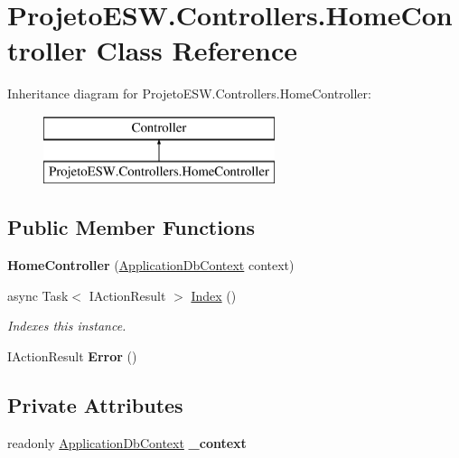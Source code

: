 \hypertarget{class_projeto_e_s_w_1_1_controllers_1_1_home_controller}{}\section{Projeto\+E\+S\+W.\+Controllers.\+Home\+Controller Class Reference}
\label{class_projeto_e_s_w_1_1_controllers_1_1_home_controller}
Inheritance diagram for Projeto\+E\+S\+W.\+Controllers.\+Home\+Controller\+:\begin{figure}[H]
\begin{center}
\leavevmode
\includegraphics[height=2.000000cm]{class_projeto_e_s_w_1_1_controllers_1_1_home_controller}
\end{center}
\end{figure}
\subsection*{Public Member Functions}
\begin{DoxyCompactItemize}
\item 
\mbox{\label{class_projeto_e_s_w_1_1_controllers_1_1_home_controller_affef8e831f2b7693effd07ee610c6e90}} 
{\bfseries Home\+Controller} (\mbox{\hyperlink{class_projeto_e_s_w_1_1_data_1_1_application_db_context}{Application\+Db\+Context}} context)
\item 
async Task$<$ I\+Action\+Result $>$ \mbox{\hyperlink{class_projeto_e_s_w_1_1_controllers_1_1_home_controller_a706bb4cc2b5f04f7436c6114fd1e2fe4}{Index}} ()
\begin{DoxyCompactList}\small\item\em Indexes this instance.\end{DoxyCompactList}\item 
\mbox{\label{class_projeto_e_s_w_1_1_controllers_1_1_home_controller_a4f5be293b3e7ad34ded40781d0b640a9}} 
I\+Action\+Result {\bfseries Error} ()
\end{DoxyCompactItemize}
\subsection*{Private Attributes}
\begin{DoxyCompactItemize}
\item 
\mbox{\label{class_projeto_e_s_w_1_1_controllers_1_1_home_controller_a71afdabdbe3c8221f63a9c7681e8f2d6}} 
readonly \mbox{\hyperlink{class_projeto_e_s_w_1_1_data_1_1_application_db_context}{Application\+Db\+Context}} {\bfseries \+\_\+context}
\end{DoxyCompactItemize}


